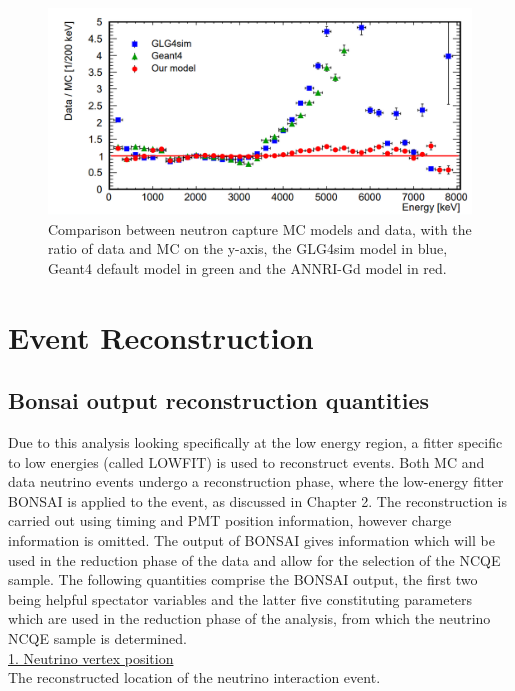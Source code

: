 \begin{figure}
\includegraphics[width=\textwidth]{Figures/annrigdmodelcompare.png}
\caption{Comparison between neutron capture MC models and data, with the ratio of data and MC on the y-axis, the GLG4sim model in blue, Geant4 default model in green and the ANNRI-Gd model in red. \cite{10.1093/ptep/ptz002}}
\label{fig:annrigdmodelcompare}
\end{figure}


\section{Event Reconstruction}
\subsection{Bonsai output reconstruction quantities}

Due to this analysis looking specifically at the low energy region, a fitter specific to low energies (called LOWFIT) is used to reconstruct events. Both MC and data neutrino events undergo a reconstruction phase, where the low-energy fitter BONSAI is applied to the event, as discussed in Chapter 2. The reconstruction is carried out using timing and PMT position information, however charge information is omitted. The output of BONSAI gives information which will be used in the reduction phase of the data and allow for the selection of the NCQE sample. The following quantities comprise the BONSAI output, the first two being helpful spectator variables and the latter five constituting parameters which are used in the reduction phase of the analysis, from which the neutrino NCQE sample is determined.\\


\noindent
\underline{1. Neutrino vertex position}\\
\noindent 
The reconstructed location of the neutrino interaction event.

